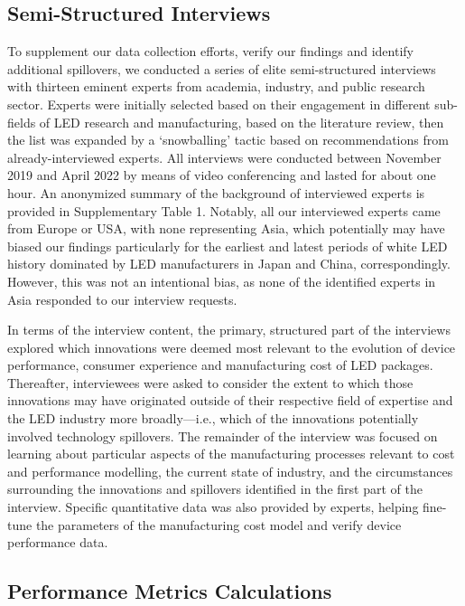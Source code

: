 \documentclass[parskip=full]{article}
\begin{document}
\subsection{Semi-Structured Interviews}

To supplement our data collection efforts, verify our findings and identify additional spillovers, we conducted a series of elite semi-structured interviews \cite{tansey2009process} with thirteen eminent experts from academia, industry, and public research sector. Experts were initially selected based on their engagement in different sub-fields of LED research and manufacturing, based on the literature review, then the list was expanded by a ‘snowballing’ tactic based on recommendations from already-interviewed experts. All interviews were conducted between November 2019 and April 2022 by means of video conferencing and lasted for about one hour. An anonymized summary of the background of interviewed experts is provided in Supplementary Table 1. Notably, all our interviewed experts came from Europe or USA, with none representing Asia, which potentially may have biased our findings particularly for the earliest and latest periods of white LED history dominated by LED manufacturers in Japan and China, correspondingly. However, this was not an intentional bias, as none of the identified experts in Asia responded to our interview requests. 

In terms of the interview content, the primary, structured part of the interviews explored which innovations were deemed most relevant to the evolution of device performance, consumer experience and manufacturing cost of LED packages. Thereafter, interviewees were asked to consider the extent to which those innovations may have originated outside of their respective field of expertise and the LED industry more broadly—i.e., which of the innovations potentially involved technology spillovers. The remainder of the interview was focused on learning about particular aspects of the manufacturing processes relevant to cost and performance modelling, the current state of industry, and the circumstances surrounding the innovations and spillovers identified in the first part of the interview. Specific quantitative data was also provided by experts, helping fine-tune the parameters of the manufacturing cost model and verify device performance data.

\subsection{Performance Metrics Calculations}
\end{document}
